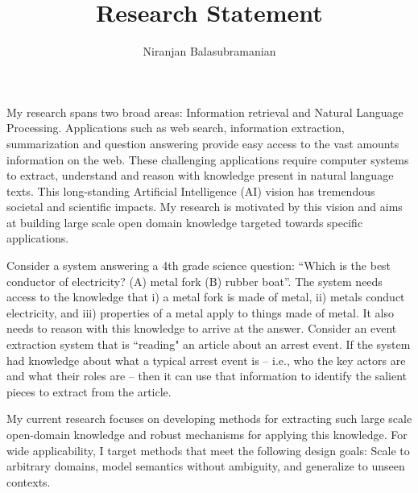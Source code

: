 \documentclass[a4paper,11pt,onecolumn]{article}
\begin{document}

\title{Research Statement}
\author{Niranjan Balasubramanian}
\maketitle

My research spans two broad areas: Information retrieval and Natural Language Processing. Applications such as web search, information extraction, summarization and question answering provide easy access to the vast amounts information on the web. These challenging applications require computer systems to extract, understand and reason with knowledge present in natural language texts. This long-standing Artificial Intelligence (AI) vision has tremendous societal and scientific impacts. My research is motivated by this vision and aims at building large scale open domain knowledge targeted towards specific applications.

Consider a system answering a 4th grade science question:  ``Which is the best conductor of electricity? (A) metal fork (B) rubber boat''. The system needs access to the knowledge that i) a metal fork is made of metal, ii) metals conduct electricity, and iii) properties of a metal apply to things made of metal. It also needs to reason with this knowledge to arrive at the answer. Consider an event extraction system that is ``reading" an article about an arrest event. If the system had knowledge about what a typical arrest event is -- i.e., who the key actors are and what their roles are -- then it can use that information to identify the salient pieces to extract from the article. 

My current research focuses on developing methods for extracting such large scale open-domain knowledge and robust mechanisms for applying this knowledge. For wide applicability, I target methods that meet the following design goals: Scale to arbitrary domains, model semantics without ambiguity, and generalize to unseen contexts. %

\end{document}
